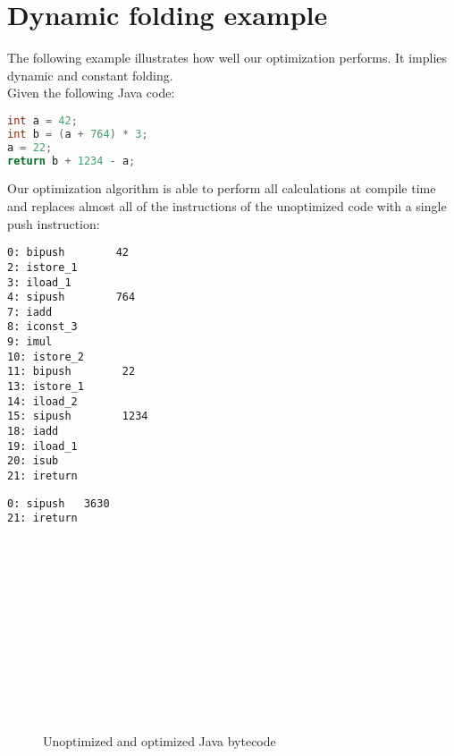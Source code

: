 \section{Dynamic folding example}
\label{sec:example}

The following example illustrates how well our optimization performs. It implies dynamic and constant folding.\\

Given the following Java code:
 
\begin{lstlisting}[language=Java]
int a = 42;
int b = (a + 764) * 3;
a = 22;
return b + 1234 - a; 
\end{lstlisting}

Our optimization algorithm is able to perform all calculations at compile time and replaces almost all of the instructions of the unoptimized code with a single push instruction:

\newsavebox{\unoptimized}
\begin{lrbox}{\unoptimized}
\begin{lstlisting}
0: bipush        42
2: istore_1
3: iload_1
4: sipush        764
7: iadd
8: iconst_3
9: imul
10: istore_2
11: bipush        22
13: istore_1
14: iload_2
15: sipush        1234
18: iadd
19: iload_1
20: isub
21: ireturn
\end{lstlisting}
\end{lrbox}

\newsavebox{\optimized}
\begin{lrbox}{\optimized}
\begin{lstlisting}[showlines=true]
0: sipush	3630
21: ireturn














\end{lstlisting}
\end{lrbox}

\begin{figure}[h!]
	\centering
	\subfloat[Unoptimized]{\usebox{\unoptimized}}
	\hspace{0.5cm}\vline\hspace{0.5cm}
	\subfloat[Optimized]{\usebox{\optimized}}
	\caption{Unoptimized and optimized Java bytecode}
\end{figure}
